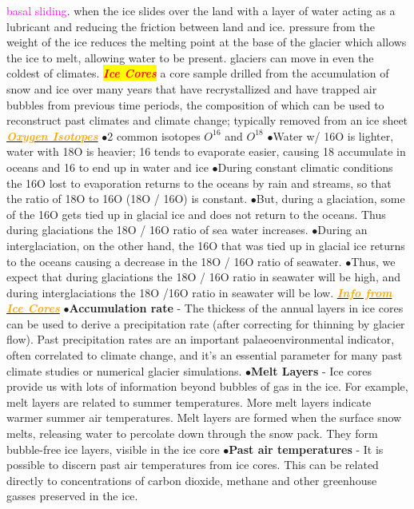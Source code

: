 \documentclass{article}
\newcommand{\ddd}{$\bullet$}
\newcommand{\red}[1]{\textcolor{red}{#1}}
\newcommand{\pink}[1]{\textcolor{magenta}{#1}}
\newcommand{\orange}[1]{\textcolor{orange}{#1}}
\newcommand{\mysection}[1]{\colorbox{yellow}{\textbf{\textit{\red{#1}}}}}
\newcommand{\mysub}[1]{\underline{\textbf{{\textit{\orange{#1}}}}}}
\newcommand{\vocab}[1]{{\pink{#1}}}
\begin{document}
\begin{multicols*}{4}
		\vocab{basal sliding}. when the ice slides over the land with a layer of water acting as a lubricant and reducing the friction between land and ice. pressure from the weight of the ice reduces the melting point at the base of the glacier which allows the ice to melt, allowing water to be present.  glaciers can move in even the coldest of climates.
        \mysection{Ice Cores} a core sample drilled from the accumulation of snow and ice over many years that have recrystallized and have trapped air bubbles from previous time periods, the composition of which can be used to reconstruct past climates and climate change; typically removed from an ice sheet
        \mysub{Oxygen Isotopes}
            \ddd 2 common isotopes $O^16$ and $O^18$
            \ddd Water w/ 16O is lighter, water with 18O is heavier; 16 tends to evaporate easier, causing 18 accumulate in oceans and 16 to end up in water and ice
            \ddd During constant climatic conditions the 16O lost to evaporation returns to the oceans by rain and streams, so that the ratio of 18O to 16O (18O / 16O) is constant.
            \ddd But, during a glaciation, some of the 16O gets tied up in glacial ice and does not return to the oceans. Thus during glaciations the 18O / 16O ratio of sea water increases.
            \ddd During an interglaciation, on the other hand, the 16O that was tied up in glacial ice returns to the oceans causing a decrease in the 18O / 16O ratio of seawater.
            \ddd Thus, we expect that during glaciations the 18O / 16O ratio in seawater will be high, and during interglaciations the 18O /16O ratio in seawater will be low.
        \mysub{Info from Ice Cores}
            \ddd \textbf{Accumulation rate} - The thickess of the annual layers in ice cores can be used to derive a precipitation rate (after correcting for thinning by glacier flow). Past precipitation rates are an important palaeoenvironmental indicator, often correlated to climate change, and it’s an essential parameter for many past climate studies or numerical glacier simulations.
            \ddd \textbf{Melt Layers} - Ice cores provide us with lots of information beyond bubbles of gas in the ice. For example, melt layers are related to summer temperatures. More melt layers indicate warmer summer air temperatures. Melt layers are formed when the surface snow melts, releasing water to percolate down through the snow pack. They form bubble-free ice layers, visible in the ice core
            \ddd \textbf{Past air temperatures} - It is possible to discern past air temperatures from ice cores. This can be related directly to concentrations of carbon dioxide, methane and other greenhouse gasses preserved in the ice.

\end{multicols*}
\end{document}
